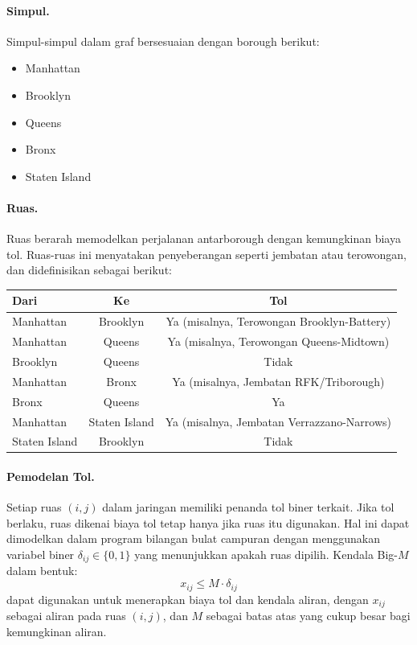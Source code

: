 \paragraph{Simpul.}
Simpul-simpul dalam graf bersesuaian dengan borough berikut:
\begin{itemize}
    \item Manhattan
    \item Brooklyn
    \item Queens
    \item Bronx
    \item Staten Island
\end{itemize}

\paragraph{Ruas.}
Ruas berarah memodelkan perjalanan antarborough dengan kemungkinan biaya tol. Ruas-ruas ini menyatakan penyeberangan seperti jembatan atau terowongan, dan didefinisikan sebagai berikut:

\begin{center}
\begin{tabular}{lcc}
\toprule
\textbf{Dari} & \textbf{Ke} & \textbf{Tol} \\
\midrule
Manhattan & Brooklyn       & Ya (misalnya, Terowongan Brooklyn-Battery) \\
Manhattan & Queens         & Ya (misalnya, Terowongan Queens-Midtown) \\
Brooklyn  & Queens         & Tidak  \\
Manhattan & Bronx          & Ya (misalnya, Jembatan RFK/Triborough) \\
Bronx     & Queens         & Ya \\
Manhattan & Staten Island  & Ya (misalnya, Jembatan Verrazzano-Narrows) \\
Staten Island & Brooklyn   & Tidak  \\
\bottomrule
\end{tabular}
\par{}\label{tab:integerProgrammingFormulations-book1-tab01}%

\end{center}

\paragraph{Pemodelan Tol.}
Setiap ruas \((i, j)\) dalam jaringan memiliki penanda tol biner terkait. Jika tol berlaku, ruas dikenai biaya tol tetap hanya jika ruas itu digunakan. Hal ini dapat dimodelkan dalam program bilangan bulat campuran dengan menggunakan variabel biner \(\delta_{ij} \in \{0,1\}\) yang menunjukkan apakah ruas dipilih. Kendala Big-\(M\) dalam bentuk:
\[
x_{ij} \le M \cdot \delta_{ij}
\]
dapat digunakan untuk menerapkan biaya tol dan kendala aliran, dengan \(x_{ij}\) sebagai aliran pada ruas \((i,j)\), dan \(M\) sebagai batas atas yang cukup besar bagi kemungkinan aliran.

